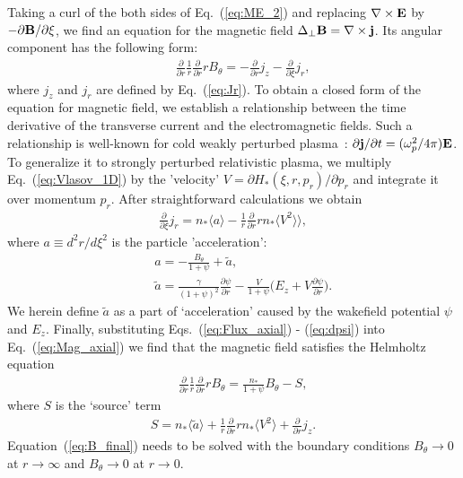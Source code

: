 \documentclass[twocolumn,showpacs,aip]{revtex4}
\begin{document}
Taking a curl of the both sides of Eq.~(\ref{eq:ME_2}) and  replacing $\nabla \times {\bf{E}}$ by $-\partial {\bf{B}}/\partial \xi$, 
 we find an equation for the magnetic field $\Delta_{\perp}{\bf{B}}=\nabla\times {\bf{j}}$. Its  angular component has the following form:
 \begin{eqnarray}
&&\frac{\partial }{\partial r}\frac{1}{r} \frac{\partial }{\partial r}r{{B}}_{\theta}=-\frac{\partial }{\partial r}j_z-\frac{\partial }{\partial \xi}j_r,
 \label{eq:Mag_axial}
\end{eqnarray}
where $j_z$ and $j_r$ are defined by Eq.~(\ref{eq:Jr}).  To obtain a closed form of the equation for magnetic field, we  establish a  relationship  between the time derivative of the transverse current  and the  electromagnetic fields. 
Such a relationship is well-known for cold weakly perturbed plasma~\cite{Keinigs_1986}: $\partial {\bf{j}}/\partial t=(\omega_p^2/4\pi){\bf{E}}$. To generalize it to   strongly perturbed relativistic plasma, we  multiply  Eq.~(\ref{eq:Vlasov_1D})
by the 'velocity' ${{V}}=\partial H_*(\xi,r,p_r)/\partial{p_r}$ and integrate it over momentum $p_r$. 
After straightforward calculations we obtain
\begin{eqnarray}
\frac{\partial}{\partial\xi}{{j}}_{r}=n_{*}\langle{{a}}\rangle-\frac{1}{r}\frac{\partial}{\partial r}rn_{*}\langle V^2\rangle\rangle,
\label{eq:Flux_axial}
\end{eqnarray}
where $a\equiv{d^2 r}/{d\xi^2}$ is the particle 'acceleration':
\begin{eqnarray}
&&{{a}}=-\frac{B_{\theta}}{1+\psi}+\tilde{a},\label{eq:accel_B_ax}\\
&&\tilde{a}=\frac{\gamma}{(1+\psi)^2}\frac{\partial\psi}{\partial r}-\frac{{{V}}}{1+\psi}\bigg(E_z+V
\frac{\partial \psi}{\partial {{r}}}\bigg).\label{eq:accel_psi_ax}
\label{eq:dpsi}
\end{eqnarray}
We herein define $\tilde{a}$ as a part of `acceleration' caused by the wakefield potential $\psi$ and $E_z$.
Finally, substituting Eqs.~(\ref{eq:Flux_axial}) - (\ref{eq:dpsi}) into Eq.~(\ref{eq:Mag_axial}) we find that the magnetic field satisfies the Helmholtz equation
\begin{eqnarray}
&&\frac{\partial}{\partial r}\frac{1}{r} \frac{\partial}{\partial r}rB_{\theta}=\frac{n_{*}}{1+\psi}B_{\theta}-S, 
\label{eq:B_final}
\end{eqnarray}
where $S$ is the `source' term 
\begin{eqnarray}
S=n_*\langle \tilde{a}\rangle+\frac{1}{r}\frac{\partial}{\partial r} rn_*\langle V^2\rangle+\frac{\partial}{\partial r}j_z.
\label{eq:S_r_}
\end{eqnarray}
Equation~(\ref{eq:B_final}) needs to be solved with the boundary conditions $B_{\theta}\rightarrow 0$ at $r\rightarrow \infty$ and $B_{\theta}\rightarrow 0$ at $r\rightarrow 0$.
\end{document}
